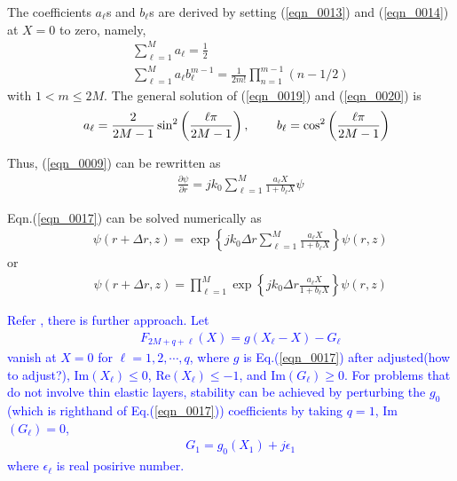 \documentclass[journal,onecolumn]{IEEEtran}
\begin{document}
The coefficients $a_{\ell}$s and $b_{\ell}$s are derived by setting (\ref{eqn_0013}) and (\ref{eqn_0014}) at $X = 0$ to zero, namely,
\begin{eqnarray}
&&\sum^M_{\ell = 1} a_\ell = \frac{1}{2}
\label{eqn_0014} \\
&&\sum^M_{\ell = 1} a_\ell b_\ell^{m - 1} = \frac{1}{2 m!} \prod^{m - 1}_{n = 1} (n - 1/2) 
\label{eqn_0015} 
\end{eqnarray}
with $1 < m \leq 2M$. 
The general solution of (\ref{eqn_0019}) and (\ref{eqn_0020}) is 
\begin{eqnarray}
&&a_\ell = \frac{2}{2 M - 1} \sin^2 \left( \frac{\ell \pi}{2 M - 1} \right), 
\hspace{0.3in} b_\ell =  \cos^2 \left( \frac{\ell \pi}{2 M - 1} \right)
\label{eqn_0016}
\end{eqnarray}

Thus, (\ref{eqn_0009}) can be rewritten as 
\begin{eqnarray}
&&\frac{\partial \psi}{\partial r} = j k_0 \sum^M_{\ell = 1} \frac{a_\ell X}{1 + b_\ell X} \psi
\label{eqn_0017}
\end{eqnarray}

Eqn.(\ref{eqn_0017}) can be solved numerically as
\begin{eqnarray}
&&\psi (r + \Delta r, z) = \exp \left\{j k_0 \Delta r \sum^M_{\ell = 1} \frac{a_\ell X}{1 + b_\ell X} \right\} \psi(r, z) 
\label{eqn_0018}
\end{eqnarray}
or 
\begin{eqnarray}
&&\psi (r + \Delta r, z) = \prod^M_{\ell = 1} \exp \left\{ j k_0 \Delta r \frac{a_\ell X}{1 + b_\ell X} \right\} \psi(r, z)
\label{eqn_0019}
\end{eqnarray}

\textcolor{blue}{
Refer \cite{MDC_HOPA}, there is further approach. Let
\begin{eqnarray}
&&F_{2M + q + \ell}(X) = g(X_\ell - X) - G_\ell
\label{eqn_00191} 
\end{eqnarray}
vanish at $X = 0$ for $\ell = 1, 2, \cdots, q$, where $g$ is Eq.(\ref{eqn_0017}) after adjusted(how to adjust?), Im$(X_\ell) \leq 0$, Re$(X_\ell) \leq -1$, and Im$(G_\ell) \geq 0$. 
For problems that do not involve thin elastic layers, stability can be achieved by perturbing the $g_0$(which is righthand of Eq.(\ref{eqn_0017})) coefficients by taking $q = 1$, Im$(G_\ell) = 0$,
\begin{eqnarray}
&&G_1 = g_0(X_1) + j \epsilon_1
\label{eqn_00192}
\end{eqnarray}   
where $\epsilon_\ell$ is real posirive number.
}
\end{document}
